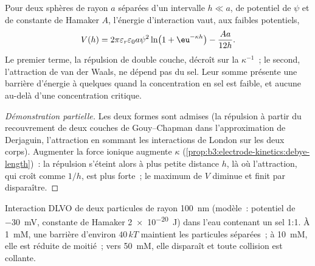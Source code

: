 \begin{theorem}\label{thm:b3:colloids:dlvo}
Pour deux sphères de rayon $a$ séparées d'un intervalle $h \ll a$, de
potentiel de 
$\psi$ et de constante de Hamaker $A$, l'énergie d'interaction vaut, aux
faibles potentiels,
\[
  V(h) = 2\pi\varepsilon_r\varepsilon_0a\psi^2\ln\bigl(1 + \eu^{-\kappa h}\bigr) - \frac{Aa}{12h} .
\]
Le premier terme, la répulsion de double couche, décroît sur la  $\kappa^{-1}$~;
le second, l'attraction de van der Waals, ne dépend pas du sel. Leur
somme présente une barrière d'énergie à quelques 
quand la concentration en sel est faible, et aucune au-delà d'une
concentration critique.
\end{theorem}

\begin{proof}[Démonstration partielle]
Les deux formes sont admises (la répulsion à partir du recouvrement de
deux couches de Gouy--Chapman dans l'approximation de Derjaguin,
l'attraction en sommant les interactions de London sur les deux corps).
Augmenter la force ionique augmente $\kappa$
(\cref{prop:b3:electrode-kinetics:debye-length})~: la répulsion
s'éteint alors à plus petite distance $h$, là où l'attraction, qui croît
comme $1/h$, est plus forte~; le maximum
de $V$ diminue et finit par disparaître.
\end{proof}

\begin{omfigure}

{\small Interaction DLVO de deux particules de rayon \qty{100}{nm}
(modèle~: potentiel de 
\qty{-30}{mV}, constante de Hamaker \qty{2e-20}{J}) dans l'eau contenant
un sel 1:1. À \qty{1}{mM}, une barrière d'environ $40\,kT$ maintient les
particules séparées~; à \qty{10}{mM}, elle est réduite de moitié~;
vers \qty{50}{mM}, elle disparaît et toute collision est collante.}
\end{omfigure}

